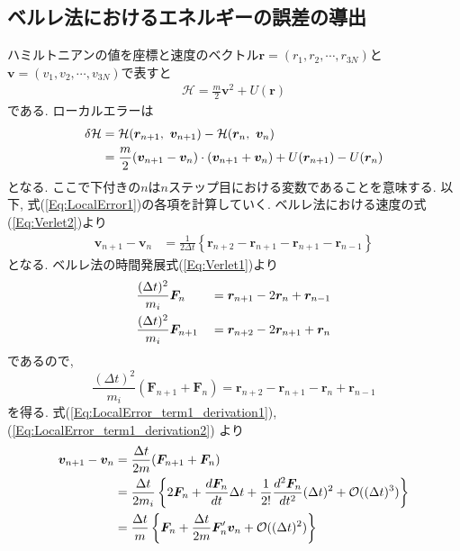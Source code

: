 \subsection{ベルレ法におけるエネルギーの誤差の導出}
ハミルトニアンの値を座標と速度のベクトル$\bm{r}=(r_{1}, r_{2}, \cdots, r_{3N})$と
$\bm{v}=(v_{1}, v_{2}, \cdots, v_{3N})$で表すと
\begin{align}
 \mathcal{H} = \frac{m}{2}\bm{v}^{2} + U(\bm{r})
 \label{Eq:Hamiltonian1}
\end{align}
である.
ローカルエラーは
\begin{align}
   \delta \mathcal{H}
&=
   \mathcal{H}(\bm{r}_{n+1},~ \bm{v}_{n+1}) - \mathcal{H}(\bm{r}_{n},~ \bm{v}_{n})
   \notag
   \\
&=
   \frac{m}{2}(\bm{v}_{n+1} - \bm{v}_{n}) \cdot (\bm{v}_{n+1} + \bm{v}_{n})
  + U(\bm{r}_{n+1}) - U(\bm{r}_{n})
 \label{Eq:LocalError1}
\end{align}
となる. 
ここで下付きの$n$は$n$ステップ目における変数であることを意味する.
以下, 式(\ref{Eq:LocalError1})の各項を計算していく.
ベルレ法における速度の式(\ref{Eq:Verlet2})より
\begin{align}
   \bm{v}_{n+1} - \bm{v}_{n}
 &=
   \frac{1}{2\Delta t}
   \left\{
          \bm{r}_{n+2} - \bm{r}_{n+1} - \bm{r}_{n+1} - \bm{r}_{n-1}
   \right\}
   \label{Eq:LocalError_term1_derivation1}
\end{align}
となる.
ベルレ法の時間発展式(\ref{Eq:Verlet1})より
\begin{alignat}{3}
   &\frac{(\Delta t)^{2}}{m_{i}} \bm{F}_{n}
&&=
   \bm{r}_{n+1} - 2 \bm{r}_{n} + \bm{r}_{n-1}
   \notag
   \\
   &\frac{(\Delta t)^{2}}{m_{i}} \bm{F}_{n+1}
&&=
   \bm{r}_{n+2} - 2 \bm{r}_{n+1} + \bm{r}_{n}
\end{alignat}
であるので, 
\begin{equation}
   \frac{(\Delta t)^{2}}{m_{i}} (\bm{F}_{n+1} + \bm{F}_{n})
 =
   \bm{r}_{n+2} - \bm{r}_{n+1} - \bm{r}_{n} + \bm{r}_{n-1}
   \label{Eq:LocalError_term1_derivation2}
\end{equation}
を得る. 
式(\ref{Eq:LocalError_term1_derivation1}), (\ref{Eq:LocalError_term1_derivation2})
より
\begin{align}
   \bm{v}_{n+1} - \bm{v}_{n}
&=
   \frac{\Delta t}{2m} (\bm{F}_{n+1} + \bm{F}_{n})
   \notag
   \\
&=
   \frac{\Delta t}{2m_{i}}
   \left\{
           2\bm{F}_{n} 
         + \frac{d \bm{F}_{n}}{dt} \Delta t
         + \frac{1}{2!} \frac{d^{2} \bm{F}_{n}}{dt^{2}} (\Delta t)^{2}
         + \mathcal{O}((\Delta t)^{3})
   \right\}
   \notag
   \\
&=
   \frac{\Delta t}{m} 
   \left\{
           \bm{F}_{n} 
         + \frac{\Delta t}{2m} \bm{F}_{n}^{\prime} \bm{v}_{n}
         + \mathcal{O}((\Delta t)^{2})
   \right\}
   \label{Eq:LocalError_term1}
\end{align}
